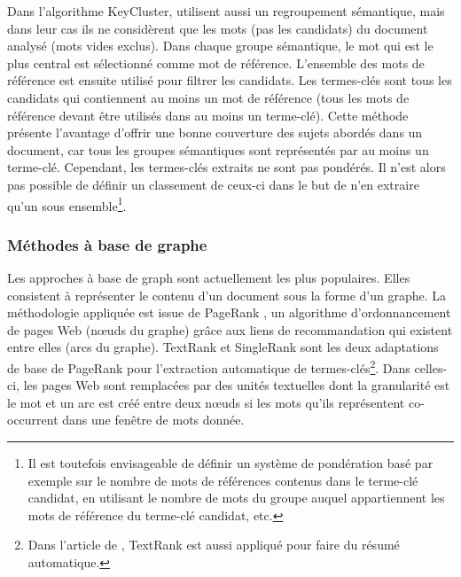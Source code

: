         Dans l'algorithme KeyCluster,   utilisent
        aussi un regroupement sémantique, mais dans leur cas ils ne
        considèrent que les mots (pas les candidats) du document analysé (mots
        vides exclus). Dans chaque groupe sémantique, le mot qui est le plus
        central est sélectionné comme mot de référence. L'ensemble des mots de
        référence est ensuite utilisé pour filtrer les candidats. Les
        termes-clés sont tous les candidats qui contiennent au moins un mot de
        référence (tous les mots de référence devant être utilisés dans au
        moins un terme-clé). Cette méthode présente l'avantage d'offrir une
        bonne couverture des sujets abordés dans un document, car tous les
        groupes sémantiques sont représentés par au moins un terme-clé.
        Cependant, les termes-clés extraits ne sont pas pondérés. Il n'est
        alors pas possible de définir un classement de ceux-ci dans le but de
        n'en extraire qu'un sous ensemble\footnote{Il est toutefois
        envisageable de définir un système de pondération basé par exemple sur
        le nombre de mots de références contenus dans le terme-clé candidat,
        en  utilisant le nombre de mots du groupe auquel appartiennent les
        mots de référence du terme-clé candidat, etc.}.

      \subsubsection{Méthodes à base de graphe}
      \label{subsubsec:main-state_of_the_art-automatic_keyphrase_extraction-unsupervised_keyphrase_extraction-graph_based_approaches}
        Les approches à base de graph sont actuellement les plus populaires. Elles consistent à représenter
        le contenu d'un document sous la forme d'un graphe. La méthodologie
        appliquée est issue de PageRank \cite{brin1998pagerank}, un
        algorithme d'ordonnancement de pages Web (n\oe{}uds du graphe) grâce
        aux liens de recommandation qui existent entre elles (arcs du graphe).
        TextRank \cite{mihalcea2004textrank} et SingleRank
        \cite{wan2008expandrank} sont les deux adaptations de base de
        PageRank pour l'extraction automatique de termes-clés\footnote{Dans
        l'article de , TextRank est aussi appliqué
        pour faire du résumé automatique.}. Dans celles-ci, les pages Web sont
        remplacées par des unités textuelles dont la granularité est le mot et
        un arc est créé entre deux n\oe{}uds si les mots qu'ils représentent
        co-occurrent dans une fenêtre de mots donnée.
      
